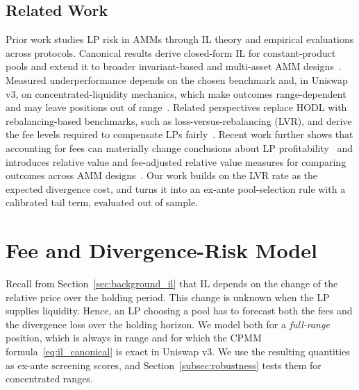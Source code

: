 \documentclass[10pt,conference,compsocconf]{IEEEtran}
\begin{document}
\subsection{Related Work}
Prior work studies LP risk in AMMs through IL theory and empirical evaluations across protocols.
Canonical results derive closed-form IL for constant-product pools and extend it to broader invariant-based and multi-asset AMM designs~\cite{tiruviluamala2022general}.
Measured underperformance depends on the chosen benchmark and, in Uniswap v3, on concentrated-liquidity mechanics, which make outcomes range-dependent and may leave positions out of range~\cite{aigner2021uniswap,loesch2021impermanent,heimbach2022risks}.
Related perspectives replace HODL with rebalancing-based benchmarks, such as loss-versus-rebalancing (LVR), and derive the fee levels required to compensate LPs fairly~\cite{milionis2022quantifying,milionis2022automated,cohen2023inefficiency}.
Recent work further shows that accounting for fees can materially change conclusions about LP profitability~\cite{roman2025impact} and introduces relative value and fee-adjusted relative value measures for comparing outcomes across AMM designs~\cite{tangri2023generalizing}.
Our work builds on the LVR rate as the expected divergence cost, and turns it into an ex-ante pool-selection rule with a calibrated tail term, evaluated out of sample.


\section{Fee and Divergence-Risk Model}
\label{sec:metrics}

Recall from Section~\ref{sec:background_il} that IL depends on the change of the relative price over the holding period. This change is unknown when the LP supplies liquidity. Hence, an LP choosing a pool has to forecast both the fees and the divergence loss over the holding horizon. We model both for a \emph{full-range} position, which is always in range and for which the CPMM formula~\eqref{eq:il_canonical} is exact in Uniswap v3. We use the resulting quantities as ex-ante screening scores, and Section~\ref{subsec:robustness} tests them for concentrated ranges.
\end{document}
